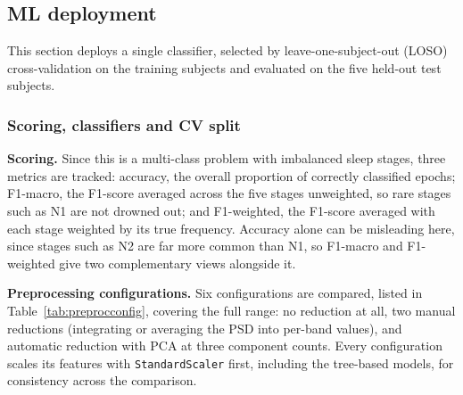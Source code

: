 \documentclass[11pt,a4paper]{article}
\begin{document}
\subsection{ML deployment}

This section deploys a single classifier, selected by leave-one-subject-out (LOSO)
cross-validation on the training subjects and evaluated on the five held-out test subjects.

\subsubsection{Scoring, classifiers and CV split}

\textbf{Scoring.} Since this is a multi-class problem with imbalanced sleep stages, three
metrics are tracked: accuracy, the overall proportion of correctly classified epochs; F1-macro,
the F1-score averaged across the five stages unweighted, so rare stages such as N1 are not
drowned out; and F1-weighted, the F1-score averaged with each stage weighted by its true
frequency. Accuracy alone can be misleading here, since stages such as N2 are far more common
than N1, so F1-macro and F1-weighted give two complementary views alongside it.


\textbf{Preprocessing configurations.} Six configurations are compared, listed in
Table~\ref{tab:preprocconfig}, covering the full range: no reduction at
all, two manual reductions (integrating or averaging the PSD into per-band values), and
automatic reduction with PCA at three component counts. Every configuration scales its features
with \texttt{StandardScaler} first, including the tree-based models, for consistency across the
comparison.
\end{document}
